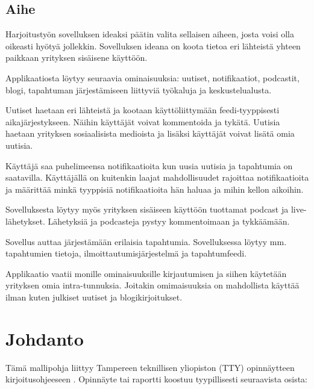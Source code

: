 \documentclass[globalnumbering,centeredcaptions]{tutthesis/tutthesis} %
\begin{document}
\section{Aihe}

Harjoitustyön sovelluksen ideaksi päätin valita sellaisen aiheen, josta voisi olla oikeasti hyötyä jollekkin. Sovelluksen ideana on koota tietoa eri lähteistä yhteen paikkaan yrityksen sisäisene käyttöön.

Applikaatiosta löytyy seuraavia ominaisuuksia: uutiset, notifikaatiot, podcastit, blogi, tapahtuman järjestämiseen liittyviä työkaluja ja keskustelualusta.

Uutiset haetaan eri lähteistä ja kootaan käyttöliittymään feedi-tyyppisesti aikajärjestykseen. Näihin käyttäjät voivat kommentoida ja tykätä. Uutisia haetaan yrityksen sosiaalisista medioista ja lisäksi käyttäjät voivat lisätä omia uutisia.

Käyttäjä saa puhelimeensa notifikaatioita kun uusia uutisia ja tapahtumia on saatavilla. Käyttäjällä on kuitenkin laajat mahdollisuudet rajoittaa notifikaatioita ja määrittää minkä tyyppisiä notifikaatioita hän haluaa ja mihin kellon aikoihin.

Sovelluksesta löytyy myös yrityksen sisäiseen käyttöön tuottamat podcast ja live-lähetykset. Lähetyksiä ja podcasteja pystyy kommentoimaan ja tykkäämään.

Sovellus auttaa järjestämään erilaisia tapahtumia. Sovelluksessa löytyy mm. tapahtumien tietoja, ilmoittautumisjärjestelmä ja tapahtumfeedi.

Applikaatio vaatii monille ominaisuuksille kirjautumisen ja siihen käytetään yrityksen omia intra-tunnuksia. Joitakin omimaisuuksia on mahdollista käyttää ilman kuten julkiset uutiset ja blogikirjoitukset.


\iffalse
\chapter{Johdanto}
\label{ch:johdanto}

Tämä mallipohja liittyy Tampereen teknillisen yliopiston (TTY) opinnäytteen kirjoitusohjeeseen \citep{Tty2017}.
Opinnäyte tai raportti koostuu tyypillisesti seuraavista osista:
\end{document}
